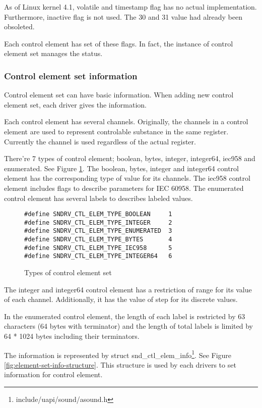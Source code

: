 \documentclass[onecolumn]{article}
\begin{document}
As of Linux kernel 4.1, volatile and timestamp flag has no actual implementation. Furthermore, inactive flag is not used. The 30 and 31 value had already been obsoleted.

Each control element has set of these flags. In fact, the instance of control element set manages the status.


\subsubsection{Control element set information}

Control element set can have basic information. When adding new control element set, each driver gives the information.

Each control element has several channels. Originally, the channels in a control element are used to represent controlable substance in the same register. Currently the channel is used regardless of the actual register.

There're 7 types of control element; boolean, bytes, integer, integer64, iec958 and enumerated. See Figure \ref{fig:element-set-types}. The boolean, bytes, integer and integer64 control element has the corresponding type of value for its channels. The iec958 control element includes flags to describe parameters for IEC 60958. The enumerated control element has several labels to describes labeled values.

\begin{figure}[htbp]
\small
\begin{verbatim}
#define SNDRV_CTL_ELEM_TYPE_BOOLEAN     1
#define SNDRV_CTL_ELEM_TYPE_INTEGER     2
#define SNDRV_CTL_ELEM_TYPE_ENUMERATED  3
#define SNDRV_CTL_ELEM_TYPE_BYTES       4
#define SNDRV_CTL_ELEM_TYPE_IEC958      5
#define SNDRV_CTL_ELEM_TYPE_INTEGER64   6
\end{verbatim}
\caption{{Types of control element set}}
\label{fig:element-set-types}
\end{figure}

The integer and integer64 control element has a restriction of range for its value of each channel. Additionally, it has the value of step for its discrete values.

In the enumerated control element, the length of each label is restricted by 63 characters (64 bytes with terminator) and the length of total labels is limited by 64 * 1024 bytes including their terminators.

The information is represented by struct snd\_ctl\_elem\_info\footnote{include/uapi/sound/asound.h}. See Figure \ref{fig:element-set-info-structure}. This structure is used by each drivers to set information for control element.
\end{document}
